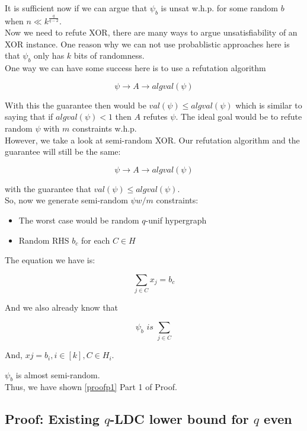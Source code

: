 \documentclass{article}
\begin{document}
\noindent It is sufficient now if we can argue that $\psi_b$ is unsat w.h.p. for some random $b$ when $n \ll k^{\frac{q}{q-2}}$.\\

\noindent Now we need to refute XOR, there are many ways to argue unsatisfiability of an XOR instance. One reason why we can not use probablistic approaches here is that $\psi_b$ only has $k$ bits of randomness.\\

\noindent One way we can have some success here is to use a refutation algorithm

\begin{equation*}
\psi \rightarrow A \rightarrow algval(\psi)
\end{equation*}

\noindent With this the guarantee then would be $val(\psi) \leq algval(\psi)$ which is similar to saying that if $algval(\psi) < 1$ then $A$ refutes $\psi$. The ideal goal would be to refute random $\psi$ with $m$ constraints w.h.p.\\

\noindent However, we take a look at semi-random XOR. Our refutation algorithm and the guarantee will still be the same:

\begin{equation*}
\psi \rightarrow A \rightarrow algval(\psi)
\end{equation*}

\noindent with the guarantee that $val(\psi) \leq algval(\psi)$.\\

\noindent So, now we generate semi-random $\psi w/ m$ constraints:

\begin{itemize}
    \item The worst case would be random $q$-unif hypergraph
    \item Random RHS $b_c$ for each $C \in H$
\end{itemize}

\noindent The equation we have is:

\begin{equation}
    \sum_{j \in C} x_j = b_c
\end{equation}

\noindent And we also already know that 

\begin{equation*}
    \psi_b \textit{ is } \sum_{j \in C}
\end{equation*}

\noindent And, $xj = b_i, i \in [k], C \in H_i$.

\noindent $\psi_b$ is almost semi-random.\\

\noindent Thus, we have shown \ref{proofp1}{ Part 1 of Proof}.

\subsection{Proof: Existing $q$-LDC lower bound for $q$ even}

\newpage

\end{document}
